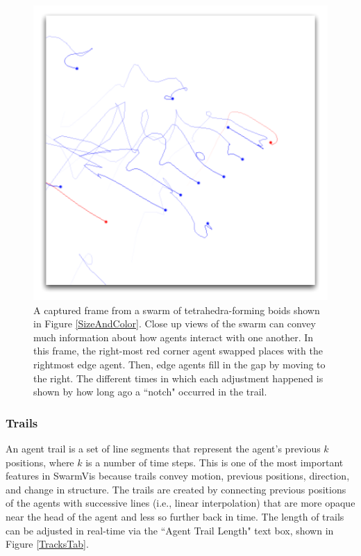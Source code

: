 \documentclass{vgtc}
\begin{document}
\begin{figure}
\centering
\includegraphics[scale=.55]{images/closeuptrails.pdf}
\caption{
A captured frame from a swarm of tetrahedra-forming boids shown in Figure \ref{SizeAndColor}.
Close up views of the swarm can convey much information about how agents interact with one another.
In this frame,  the right-most red corner agent swapped places with the rightmost edge agent.
Then, edge agents fill in the gap by moving to the right. The different times in which each adjustment happened
is shown by how long ago a ``notch" occurred in the trail.}
\label{CloseTrails}
\end{figure}

\subsubsection{Trails}

An agent trail is a set of line segments that represent the agent's previous $k$ positions, where $k$ is a number of time steps.
This is one of the most important features in SwarmVis because trails convey motion, previous positions, direction,
and change in structure.
The trails are created by connecting previous positions of the agents with
successive lines (i.e., linear interpolation) that are more opaque near the head of the agent and less so further back in time.
The length of trails can be adjusted in real-time via the ``Agent Trail Length" text box, shown in
Figure \ref{TracksTab}.
\end{document}
